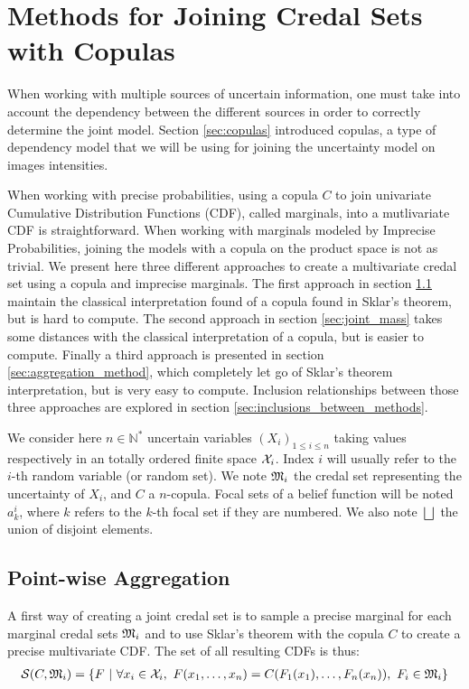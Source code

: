 \section{Methods for Joining Credal Sets with Copulas}\label{sec:methods_for_joining_credal_sets}
When working with multiple sources of uncertain information, one must take into account the dependency between the different sources in order to correctly determine the joint model. Section \ref{sec:copulas} introduced copulas, a type of dependency model that we will be using for joining the uncertainty model on images intensities. 

When working with precise probabilities, using a copula $C$ to join univariate Cumulative Distribution Functions (CDF), called marginals, into a mutlivariate CDF is straightforward. When working with marginals modeled by Imprecise Probabilities, joining the models with a copula on the product space is not as trivial. We present here three different approaches to create a multivariate credal set using a copula and imprecise marginals. The first approach in section \ref{sec:robust_method} maintain the classical interpretation found of a copula found in Sklar's theorem, but is hard to compute. The second approach in section \ref{sec:joint_mass} takes some distances with the classical interpretation of a copula, but is easier to compute. Finally a third approach is presented in section \ref{sec:aggregation_method}, which completely let go of Sklar's theorem interpretation, but is very easy to compute. Inclusion relationships between those three approaches are explored in section \ref{sec:inclusions_between_methods}.

We consider here $n\in\mathbb{N}^*$ uncertain variables $(X_i)_{1\leqslant i\leqslant n}$ taking values respectively in an totally ordered finite space ${\mathcal{X}}_i$. Index $i$ will usually refer to the $i$-th random variable (or random set). We note ${\mathfrak{M}}_i$ the credal set representing the uncertainty of $X_i$, and $C$ a $n$-copula. Focal sets of a belief function will be noted $a^i_k$, where $k$ refers to the $k$-th focal set if they are numbered. We also note $\bigsqcup$ the union of disjoint elements.

\subsection{Point-wise Aggregation}\label{sec:robust_method}
A first way of creating a joint credal set is to sample a precise marginal for each marginal credal sets ${\mathfrak{M}}_i$ and to use Sklar's theorem with the copula $C$ to create a precise multivariate CDF. The set of all resulting CDFs is thus:
\begin{eqnarray}\label{eq:robust_ancestor}
    \mathcal{S}(C,{\mathfrak{M}}_i) = \{F~|~\forall x_i \in {\mathcal{X}}_i,~ F(x_1,\dots,x_n) = C(F_1(x_1), \dots, F_n(x_n)),~F_i\in{\mathfrak{M}}_i \}
\end{eqnarray}

